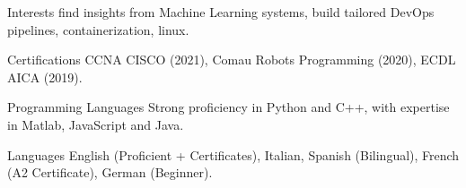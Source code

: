 








\begin{cvhonors}
  \cvhonor
    {\hspace{-1.5cm}Interests} %
    {%
    find insights from Machine Learning systems, 
    build tailored DevOps pipelines,
    containerization, linux.%
    } %
    {} %
    {} %
    
  \cvhonor
    {\hspace{-1.5cm}Certifications} %
    {%
    CCNA CISCO (2021), Comau Robots Programming (2020), ECDL AICA (2019).%
    } %
    {} %
    {} %
    
  \cvhonor
    {\hspace{-1.5cm}Programming Languages} %
    {%
    Strong proficiency in Python and C++, with expertise in Matlab, JavaScript and Java.
    } %
    {} %
    {} %

  \cvhonor
    {\hspace{-1.5cm}Languages} %
    {%
    English (Proficient + Certificates), 
    Italian, Spanish (Bilingual), 
    French (A2 Certificate),
    German (Beginner).%
    } %
    {} %
    {} %
\end{cvhonors}